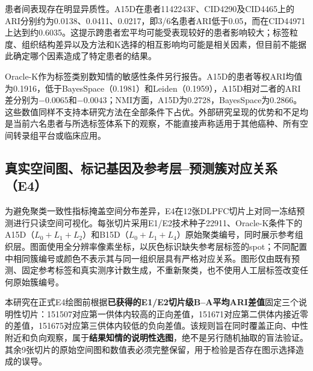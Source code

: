 患者间表现存在明显异质性。A15D在患者1142243F、CID4290及CID4465上的ARI分别约为0.0138、0.0411、0.0217，即3/6名患者ARI低于0.05，而在CID44971上达到约0.6035。这提示跨患者宏平均可能受表现较好的患者影响较大；标签粒度、组织结构差异以及方法和K选择的相互影响均可能是相关因素，但目前不能据此确定哪个因素造成了特定患者的结果。

Oracle-K作为标签类别数知情的敏感性条件另行报告。A15D的患者等权ARI均值为0.1916，低于BayesSpace（0.1981）和Leiden（0.1959），A15D相对二者的ARI差分别为$-0.0065$和$-0.0043$；NMI方面，A15D为0.2728，BayesSpace为0.2866。这些数值同样不支持本研究方法在全部条件下占优。外部研究呈现的优势和不足均是当前六名患者与所选标签体系下的观察，不能直接声称适用于其他癌种、所有空间转录组平台或临床应用。

\subsection{真实空间图、标记基因及参考层--预测簇对应关系（E4）}
\label{subsec:cellcharter-e4-v1}

为避免聚类一致性指标掩盖空间分布差异，E4在12张DLPFC切片上对同一冻结预测进行只读空间可视化。每张切片采用E1/E2技术种子22911、Oracle-K条件下的A15D（$L_0+L_1+L_2$）和B15D（$L_0+L_1+L_4$）原始聚类编号，同时展示参考组织层。图面使用全分辨率像素坐标，以灰色标识缺失参考层标签的spot；不同配置中相同簇编号或颜色不表示其与同一组织层具有严格对应关系。图形仅由既有预测、固定参考标签和真实测序计数生成，不重新聚类，也不使用人工层标签改变任何原始簇编号。

本研究在正式E4绘图前根据\textbf{已获得的E1/E2切片级B--A平均ARI差值}固定三个说明性切片：151507对应第一供体内较高的正向差值，151671对应第二供体内接近零的差值，151675对应第三供体内较低的负向差值。该规则旨在同时覆盖正向、中性附近和负向观察，属于\textbf{结果知情的说明性选图}，绝不是另行随机抽取的盲法验证。其余9张切片的原始空间图和数值表必须完整保留，用于检验是否存在图示选择造成的误导。

